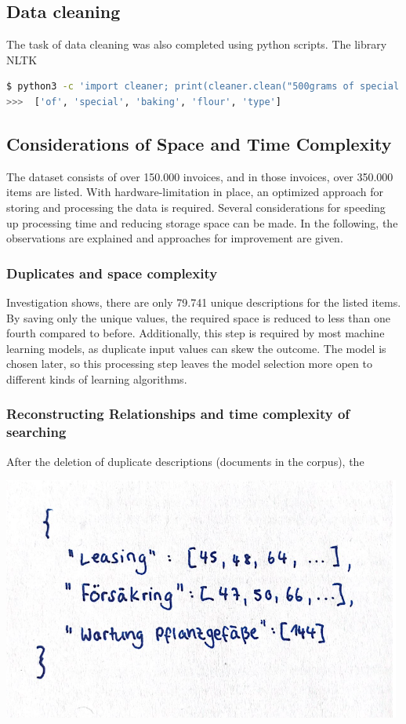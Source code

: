 	
	\subsection{Data cleaning}
	
	The task of data cleaning was also completed using python scripts. The library \ac{NLTK}
	
	\begin{lstlisting}[language=sh]
$ python3 -c 'import cleaner; print(cleaner.clean("500grams of special baking flour type 504"))' 
>>>  ['of', 'special', 'baking', 'flour', 'type']
	\end{lstlisting}
	 

	
	
	\subsection{Considerations of Space and Time Complexity}
	The dataset consists of over 150.000 invoices, and in those invoices, over 350.000 items are listed. 
	With hardware-limitation in place, an optimized approach for storing and processing the data is required. 
	Several considerations for speeding up processing time and reducing storage space can be made. 
	In the following, the observations are explained and approaches for improvement are given.

		\subsubsection{Duplicates and space complexity}
		Investigation shows, there are only 79.741 unique descriptions for the listed items. By saving only the unique values, the required space is reduced to less than one fourth compared to before. Additionally, this step is required by most machine learning models, as duplicate input values can skew the outcome. The model is chosen later, so this processing step leaves the model selection more open to different kinds of learning algorithms.
		
		\subsubsection{Reconstructing Relationships and time complexity of searching}
		After the deletion of duplicate descriptions (documents in the corpus), the 
		
		\includegraphics[height=8cm]{Bilder/description_map.png}

